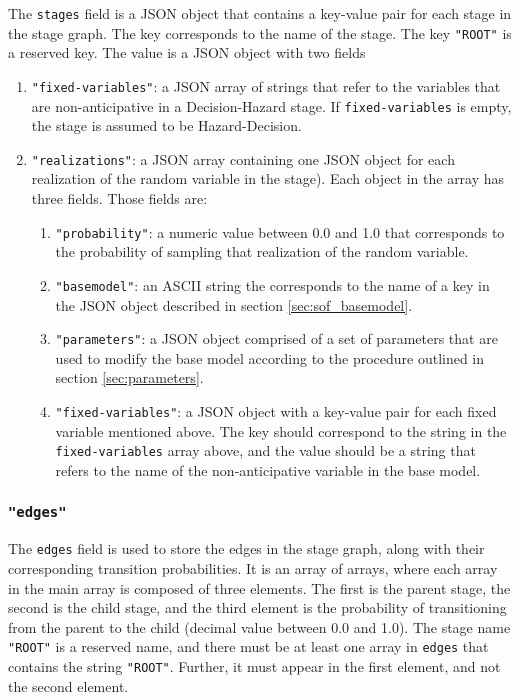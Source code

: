 \documentclass[final,1p,times]{elsarticle}
\begin{document}
The \texttt{stages} field is a JSON object that contains a key-value pair for each stage in the stage graph. The key corresponds to the name of the stage. The key \texttt{"ROOT"} is a reserved key. The value is a JSON object with two fields
\begin{enumerate}
    \item \texttt{"fixed-variables"}: a JSON array of strings that refer to the variables that are non-anticipative in a Decision-Hazard stage. If \texttt{fixed-variables} is empty, the stage is assumed to be Hazard-Decision.
    \item \texttt{"realizations"}: a JSON array containing one JSON object for each realization of the random variable in the stage). Each object in the array has three fields. Those fields are:
    \begin{enumerate}
        \item \texttt{"probability"}: a numeric value between 0.0 and 1.0 that corresponds to the probability of sampling that realization of the random variable.
    
        \item \texttt{"basemodel"}: an ASCII string the corresponds to the name of a key in the JSON object described in section \ref{sec:sof_basemodel}.
        
        \item \texttt{"parameters"}: a JSON object comprised of a set of parameters that are used to modify the base model according to the procedure outlined in section \ref{sec:parameters}.
        
        \item \texttt{"fixed-variables"}: a JSON object with a key-value pair for each fixed variable mentioned above. The key should correspond to the string in the \texttt{fixed-variables} array above, and the value should be a string that refers to the name of the non-anticipative variable in the base model.
        
    \end{enumerate}
\end{enumerate}

\subsubsection{\texttt{"edges"}}

The \texttt{edges} field is used to store the edges in the stage graph, along with their corresponding transition probabilities. It is an array of arrays, where each array in the main array is composed of three elements. The first is the parent stage, the second is the child stage, and the third element is the probability of transitioning from the parent to the child (decimal value between 0.0 and 1.0). The stage name \texttt{"ROOT"} is a reserved name, and there must be at least one array in \texttt{edges} that contains the string \texttt{"ROOT"}. Further, it must appear in the first element, and not the second element.
 
\end{document}

